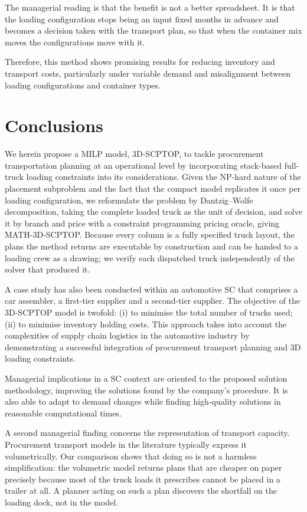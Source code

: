 {{\color{blue}
The managerial reading is that the benefit is not a better spreadsheet. It is
that the loading configuration stops being an input fixed months in advance and
becomes a decision taken with the transport plan, so that when the container
mix moves the configurations move with it.
}

{\color{blue}
Therefore, this method shows promising results for reducing inventory and transport costs, particularly under variable demand and misalignment between loading configurations and container types.
\section{Conclusions}
We herein propose a MILP model, 3D-SCPTOP, to tackle procurement transportation planning at an operational level by incorporating stack-based full-truck loading constraints into its considerations. Given the NP-hard nature of the placement subproblem and the fact that the compact model replicates it once per loading configuration, we reformulate the problem by Dantzig--Wolfe decomposition, taking the complete loaded truck as the unit of decision, and solve it by branch and price with a constraint programming pricing oracle, giving MATH-3D-SCPTOP. Because every column is a fully specified truck layout, the plans the method returns are executable by construction and can be handed to a loading crew as a drawing; we verify each dispatched truck independently of the solver that produced it.
}

A case study has also been conducted within an automotive SC that comprises a car assembler, a first-tier supplier and a second-tier supplier. The objective of the 3D-SCPTOP model is twofold: (i) to minimise the total number of trucks used; (ii) to minimise inventory holding costs. This approach takes into account the complexities of supply chain logistics in the automotive industry by demonstrating a successful integration of procurement transport planning and 3D loading constraints.

Managerial implications in a SC context are oriented to the proposed solution methodology, improving the solutions found by the company’s procedure. It is also able to adapt to demand changes while finding high-quality solutions in reasonable computational times.

{\color{blue}
A second managerial finding concerns the representation of transport capacity. Procurement transport models in the literature typically express it volumetrically. Our comparison shows that doing so is not a harmless simplification: the volumetric model returns plans that are cheaper on paper precisely because most of the truck loads it prescribes cannot be placed in a trailer at all. A planner acting on such a plan discovers the shortfall on the loading dock, not in the model.
}

}
